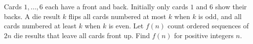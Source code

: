Cards $1,\ldots,6$ each have a front and back. Initially only cards $1$ and $6$ show their backs. A die result $k$ flips all cards numbered at most $k$ when $k$ is odd, and all cards numbered at least $k$ when $k$ is even. Let $f(n)$ count ordered sequences of $2n$ die results that leave all cards front up. Find $f(n)$ for positive integers $n$.
